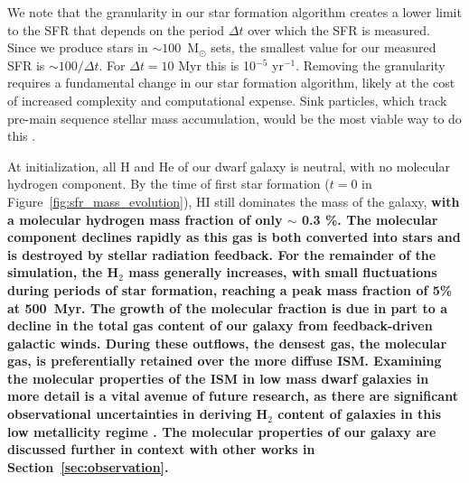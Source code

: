 \documentclass[fleqn,usenatbib,useAMS]{mnras}
\begin{document}
We note that the granularity in our star formation algorithm creates a lower limit to the SFR that depends on the period $\Delta t$ over which the SFR is measured. Since we produce stars in $\sim 100$~M$_{\odot}$ sets, the smallest value for our measured SFR is $\sim 100/ \Delta t$. For $\Delta t = 10$ Myr this is 10$^{-5}$ yr$^{-1}$. Removing the granularity requires a fundamental change in our star formation algorithm, likely at the cost of increased complexity and computational expense. Sink particles, which track pre-main sequence stellar mass accumulation, would be the most viable way to do this \citep[see for example ][]{Krumholz2004,Federrath2010,GongOstriker2013,BleulerTeyssier2014,Sormani2017}.

At initialization, all H and He of our dwarf galaxy is neutral, with no molecular hydrogen component. By the time of first star formation ($t=0$ in Figure~\ref{fig:sfr_mass_evolution}), HI still dominates the mass of the galaxy, \textbf{ with a molecular hydrogen mass fraction of only $\sim$ 0.3 \%. The molecular component declines rapidly as this gas is both converted into stars and is destroyed by stellar radiation feedback. For the remainder of the simulation, the H$_2$ mass generally increases,  with small fluctuations during periods of star formation, reaching a peak mass fraction of 5\% at 500~Myr. The growth of the molecular fraction is due in part to a decline in the total gas content of our galaxy from feedback-driven galactic winds. During these outflows, the densest gas, the molecular gas, is preferentially retained over the more diffuse ISM. Examining the molecular properties of the ISM in low mass dwarf galaxies in more detail is a vital avenue of future research, as there are significant observational uncertainties in deriving H$_2$ content of galaxies in this low metallicity regime \citep{Leroy2008,McQuinn2012,Amorin2016}. The molecular properties of our galaxy are discussed further in context with other works in Section~\ref{sec:observation}.}
\end{document}
